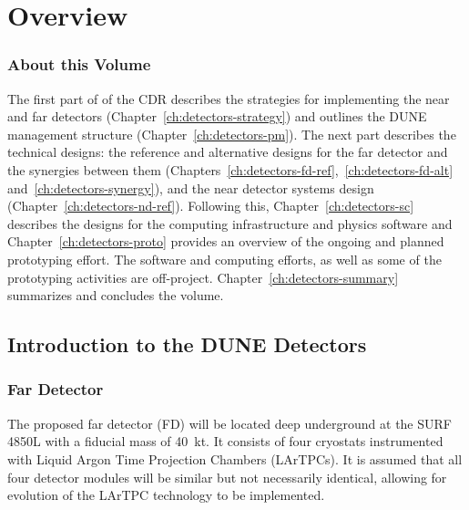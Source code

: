 \chapter{Overview}
\label{ch:detectors-overview}




\subsection{About this Volume}

The first part of \voldune{} of the CDR describes the strategies for
implementing the near and far detectors
(Chapter~\ref{ch:detectors-strategy}) and outlines the DUNE management
structure (Chapter~\ref{ch:detectors-pm}). The next part describes the
technical designs: the reference and alternative designs for the far
detector and the synergies between them
(Chapters~\ref{ch:detectors-fd-ref},~\ref{ch:detectors-fd-alt}
and~\ref{ch:detectors-synergy}), and the near detector systems design
(Chapter~\ref{ch:detectors-nd-ref}).  Following this,
Chapter~\ref{ch:detectors-sc} describes the designs for the computing
infrastructure and physics software and
Chapter~\ref{ch:detectors-proto} provides an overview of the ongoing
and planned prototyping effort.  The software and computing efforts,
as well as some of the prototyping activities are
off-project. Chapter~\ref{ch:detectors-summary} summarizes and
concludes the volume.
 
\section{Introduction to the DUNE Detectors}
\label{sec:intro-dune-det}

\subsection{Far Detector}
\label{sec:intro-dune-far-det}

The proposed far detector (FD) will be located deep underground at the
SURF 4850L with a fiducial mass of 40~kt. It consists of four %
cryostats instrumented with Liquid Argon Time Projection
Chambers (LArTPCs). 
It is assumed that all four detector modules will be similar but not
necessarily identical, allowing for evolution of the LArTPC
technology to be implemented.  %

